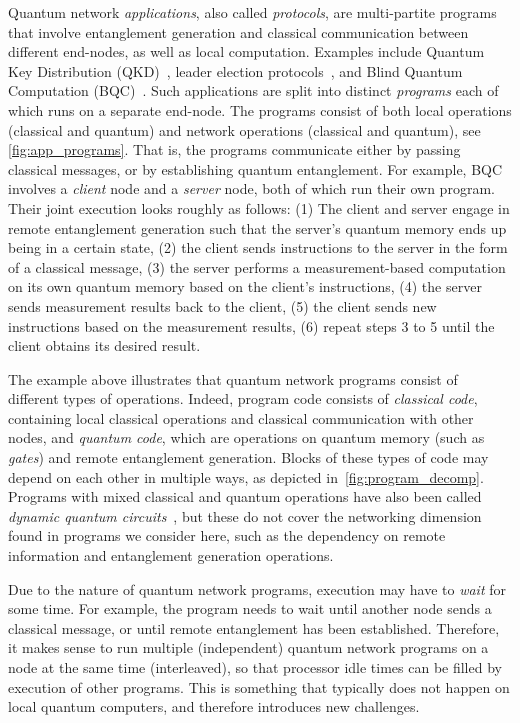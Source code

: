 Quantum network \textit{applications}, also called \textit{protocols}, are multi-partite programs that involve entanglement generation and classical communication between different end-nodes, as well as local computation.
Examples include Quantum Key Distribution (QKD)~\cite{bb84, ekert1991quantum}, leader election protocols~\cite{kobayashi2014simpler, ganz2009quantum}, and Blind Quantum Computation (BQC)~\cite{Wehner2018stages}.
Such applications are split into distinct \textit{programs} each of which runs on a separate end-node.
The programs consist of both local operations (classical and quantum) and network operations (classical and quantum), see \cref{fig:app_programs}.
That is, the programs communicate either by passing classical messages, or by establishing quantum entanglement.
For example, BQC involves a \textit{client} node and a \textit{server} node, both of which run their own program.
Their joint execution looks roughly as follows:
    (1) The client and server engage in remote entanglement generation such that the server's quantum memory ends up being in a certain state,
    (2) the client sends instructions to the server in the form of a classical message,
    (3) the server performs a measurement-based computation on its own quantum memory based on the client's instructions,
    (4) the server sends measurement results back to the client,
    (5) the client sends new instructions based on the measurement results,
    (6) repeat steps 3 to 5 until the client obtains its desired result.

The example above illustrates that quantum network programs consist of different
types of operations.
Indeed, program code consists of \textit{classical code}, containing local classical operations and classical communication with other nodes, and \textit{quantum code}, which are operations on quantum memory (such as \textit{gates}) and remote entanglement generation.
Blocks of these types of code may depend on each other in multiple ways, as depicted in~\cref{fig:program_decomp}.
Programs with mixed classical and quantum operations have also been called \textit{dynamic quantum circuits}~\cite{cross2021openqasm, burgholzer2021towards}, but these do not cover the networking dimension found in programs we consider here, such as the dependency on remote information and entanglement generation operations.

Due to the nature of quantum network programs, execution may have to \textit{wait} for some time. For example, the program needs to wait until another node sends a classical message, or until remote entanglement has been established.
Therefore, it makes sense to run multiple (independent) quantum network programs on a node at the same time (interleaved), so that processor idle times can be filled by execution of other programs. This is something that typically does not happen on local quantum computers, and therefore introduces new challenges.

